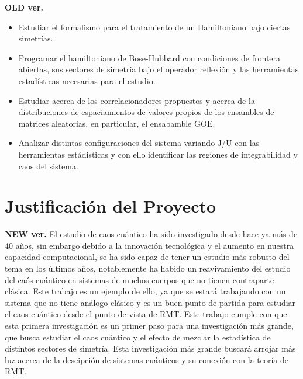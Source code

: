 \documentclass[spanish,titlepage,table]{practicas}
\begin{document}
 \textbf{OLD ver.}
 \begin{itemize}
    \item Estudiar el formalismo para el tratamiento de un Hamiltoniano bajo ciertas simetrías.
    \item Programar el hamiltoniano de Bose-Hubbard con condiciones de frontera abiertas, sus sectores de simetría bajo el operador reflexión y las herramientas estadísticas necesarias para el estudio.
    \item Estudiar acerca de los correlacionadores propuestos y acerca de la distribuciones de espaciamientos de valores propios de los ensambles de matrices aleatorias, en particular, el ensabamble GOE.
    \item Analizar distintas configuraciones del sistema variando J/U\janote{\$\$} con las herramientas estádisticas y con ello identificar las regiones de integrabilidad y caos del sistema.
 \end{itemize}

\section{Justificación del Proyecto}
\textbf{NEW ver.}
El estudio de caos cuántico ha sido investigado desde hace ya más de 40 años, sin embargo debido a la innovación tecnológica y el aumento en nuestra capacidad 
computacional, se ha sido capaz de tener un estudio más robusto del tema en los últimos años, notablemente ha habido un reavivamiento del estudio del caós cuántico 
en sistemas de muchos cuerpos que no tienen contraparte clásica. Este trabajo es un ejemplo de ello, ya que se estará trabajando con 
un sistema que no tiene análogo clásico y es un buen punto de partida para estudiar el caos cuántico desde el punto de vista de RMT.
Este trabajo cumple con que esta primera investigación es 
un primer paso para una investigación más grande, que busca estudiar el caos cuántico y el efecto de mezclar la estadística 
de distintos sectores de simetría. Esta investigación más grande buscará arrojar más luz acerca de la descipción de sistemas cuánticos y su conexión con la teoría de RMT.
\end{document}
